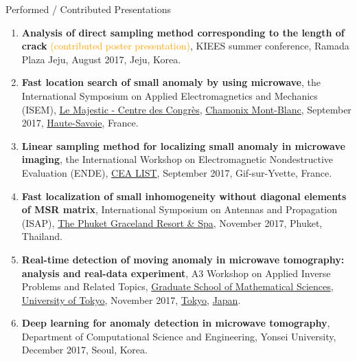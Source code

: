 \documentclass{resume} %
\begin{document}
\begin{rSection}{Performed / Contributed Presentations}
\begin{enumerate}
\item\label{P-KIEES2017B} \textbf{Analysis of direct sampling method corresponding to the length of crack} \textcolor{orange}{(contributed poster presentation)}, KIEES summer conference, Ramada Plaza Jeju, August 2017, Jeju, Korea.
\item\label{P-ISEM2017} \textbf{Fast location search of small anomaly by using microwave}, the  International Symposium on Applied Electromagnetics and Mechanics (ISEM), \href{http://www.chamonix.com/centre-des-congres-le-majestic,48-63803,fr.html}{Le Majestic - Centre des Congr{\`e}s}, \href{http://www.chamonix.com}{Chamonix Mont-Blanc}, September 2017, \href{https://www.hautesavoie.fr}{Haute-Savoie}, France.
\item\label{P-ENDE2017} \textbf{Linear sampling method for localizing small anomaly in microwave imaging}, the  International Workshop on Electromagnetic Nondestructive Evaluation (ENDE), \href{https://www-list.cea.fr/}{CEA LIST}, September 2017, Gif-sur-Yvette, France.
\item\label{P-ISAP2017} \textbf{Fast localization of small inhomogeneity without diagonal elements of MSR matrix}, International Symposium on Antennas and Propagation (ISAP), \href{http://www.phuketgraceland.com/}{The Phuket Graceland Resort \& Spa}, November 2017, Phuket, Thailand.
\item\label{P-TOKYO2017} \textbf{Real-time detection of moving anomaly in microwave tomography: analysis and real-data experiment}, A3 Workshop on Applied Inverse Problems and Related Topics, \href{http://www.ms.u-tokyo.ac.jp}{Graduate School of Mathematical Sciences}, \href{http://www.u-tokyo.ac.jp/en/}{University of Tokyo}, November 2017, \href{https://www.metro.tokyo.lg.jp}{Tokyo}, \href{https://www.japan.go.jp}{Japan}.
\item\label{P-CSE2017B} \textbf{Deep learning for anomaly detection in microwave tomography}, Department of Computational Science and Engineering, Yonsei University, December 2017, Seoul, Korea.

\end{enumerate}
\end{rSection}
\end{document}
